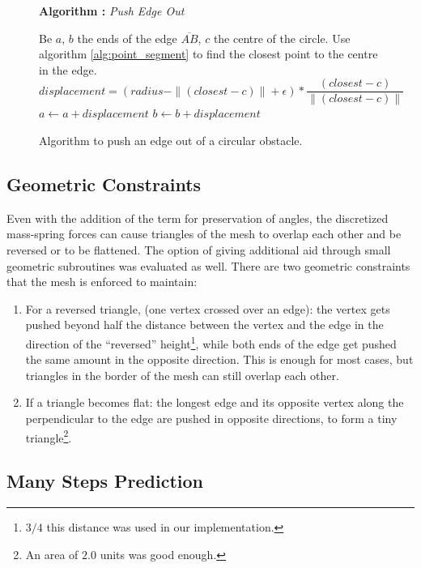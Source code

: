 \documentclass[journal]{IEEEtran}
\newcounter{algorithm}
\newenvironment{algorithmicieee}[1]
  {\refstepcounter{algorithm}
   \begin{lrbox}{\ieeealgbox}
   \begin{minipage}{\dimexpr\columnwidth-2\fboxsep-2\fboxrule}
   \textbf{Algorithm \arabic{algorithm}:} \textit{#1} \par
   \begin{algorithmic}[1]}
  {\end{algorithmic}
   \end{minipage}
   \end{lrbox}\noindent\fbox{\usebox{\ieeealgbox}}}
\begin{document}
\begin{figure}
  \begin{algorithmicieee}{Push Edge Out}\label{alg:push_edge}
 \STATE Be $a$, $b$ the ends of the edge $\overline{AB}$, $c$ the centre of the circle.  Use algorithm \ref{alg:point_segment} to find the closest point to the centre in the edge.
  \STATE $displacement = (radius - \|(closest - c)\| + \epsilon) * \dfrac{(closest - c)}{\|(closest - c)\|}$
  \STATE $ a \gets a + displacement$
  \STATE $ b \gets b + displacement$
 \ENDIF
\end{algorithmicieee}
 \caption{Algorithm to push an edge out of a circular obstacle.}
\end{figure}

\subsection{Geometric Constraints}
Even with the addition of the term for preservation of angles, the discretized mass-spring forces can cause triangles of the mesh to overlap each other and be reversed or to be flattened.  The option of giving additional aid through small geometric subroutines was evaluated as well.  There are two geometric constraints that the mesh is enforced to maintain:

\begin{enumerate}
 \item For a reversed triangle, (one vertex crossed over an edge): the vertex gets pushed beyond half the distance between the vertex and the edge in the direction of the ``reversed'' height\footnote{$3/4$ this distance was used in our implementation.}, while both ends of the edge get pushed the same amount in the opposite direction.  This is enough for most cases, but triangles in the border of the mesh can still overlap each other.

 \item If a triangle becomes flat: the longest edge and its opposite vertex along the perpendicular to the edge are pushed in opposite directions, to form a tiny triangle\footnote{An area of $2.0$ units was good enough.}.
\end{enumerate}

\subsection{Many Steps Prediction}
\label{sec:manysteps}
\end{document}
